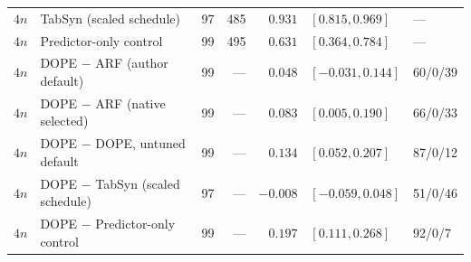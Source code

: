 \begin{longtable}{llrrrll}
$4n$ & TabSyn (scaled schedule) & 97 & 485 & $0.931$ & $[0.815, 0.969]$ & --- \\
$4n$ & Predictor-only control & 99 & 495 & $0.631$ & $[0.364, 0.784]$ & --- \\
$4n$ & DOPE $-$ ARF (author default) & 99 & --- & $0.048$ & $[-0.031, 0.144]$ & 60/0/39 \\
$4n$ & DOPE $-$ ARF (native selected) & 99 & --- & $0.083$ & $[0.005, 0.190]$ & 66/0/33 \\
$4n$ & DOPE $-$ DOPE, untuned default & 99 & --- & $0.134$ & $[0.052, 0.207]$ & 87/0/12 \\
$4n$ & DOPE $-$ TabSyn (scaled schedule) & 97 & --- & $-0.008$ & $[-0.059, 0.048]$ & 51/0/46 \\
$4n$ & DOPE $-$ Predictor-only control & 99 & --- & $0.197$ & $[0.111, 0.268]$ & 92/0/7 \\
\bottomrule
\end{longtable}
